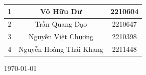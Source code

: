 \begin{titlepage}
\begin{center}
\begin{table}[H]
\begin{tabular}{|c|c|c|}
                \hline
                1 & Võ Hữu Dư & 2210604\\
                \hline
                2 & Trần Quang Đạo & 2210647\\
                \hline
                3 & Nguyễn Việt Chương & 2210398\\
                \hline
                4 & Nguyễn Hoàng Thái Khang & 2211448\\
                \hline
            \end{tabular}
        \end{table}
    \end{center}        
    \vfill
    \large
    \begin{center}
        \today
    \end{center}
\end{titlepage}